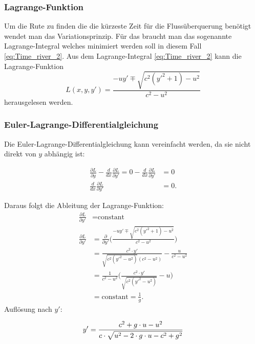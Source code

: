 \subsubsection{Lagrange-Funktion} 
Um die Rute zu finden die die kürzeste Zeit für die Flussüberquerung benötigt wendet man das Variationsprinzip. Für das braucht man das sogenannte Lagrange-Integral welches minimiert werden soll in diesem Fall \ref{eq:Time_river_2}. 
Aus dem Lagrange-Integral \ref{eq:Time_river_2} kann die Lagrange-Funktion
\begin{equation}\label{eq:lagrange_integral}
    L(x, y, y') = \frac{-uy' \mp \sqrt{c^2(y'^2+1)-u^2}}{c^2-u^2}
\end{equation}
herausgelesen werden. 

\subsubsection{Euler-Lagrange-Differentialgleichung} Die Euler-Lagrange-Differentialgleichung kann vereinfacht werden, da sie nicht direkt von \(y\) abhängig ist:

\begin{align}
    \frac{\partial L}{\partial y} - \frac{d}{dx}\frac{\partial L}{\partial y'} = 0 - \frac{d}{dx}\frac{\partial L}{\partial y'} &= 0 \\
    \frac{d}{dx}\frac{\partial L}{\partial y'} &= 0.
\end{align}

Daraus folgt die Ableitung der Lagrange-Funktion:
\begin{align}
    \frac{\partial L}{\partial y'} &= \text{constant} \label{eq:Lagrange_derivites_1}\\
    \frac{\partial L}{\partial y'} &= \frac{\partial}{\partial y'} \biggl (\frac{-uy' \mp \sqrt{c^2(y'^2+1)-u^2}}{c^2-u^2}\biggr) \\
    &= \frac{c^2\cdot y'}{\sqrt{c^2(y'^2-u^2)}(c^2-u^2)} - \frac{u}{c^2-u^2} \\
    &=  \frac{1}{c^2-u^2} \biggl( \frac{c^2\cdot y'}{\sqrt{c^2(y'^2-u^2)}} - u \biggr ) \\
    &= \text{constant} = \frac{1}{g}.\label{eq:Lagrange_derivites_2}
\end{align}
Auflösung nach \(y'\):
   
\begin{equation}
    y' = \frac{c^2 + g\cdot u - u^2}{c \cdot \sqrt{u^2-2\cdot g\cdot u - c^2 + g^2}} \label{eq:angle} \\
\end{equation}

